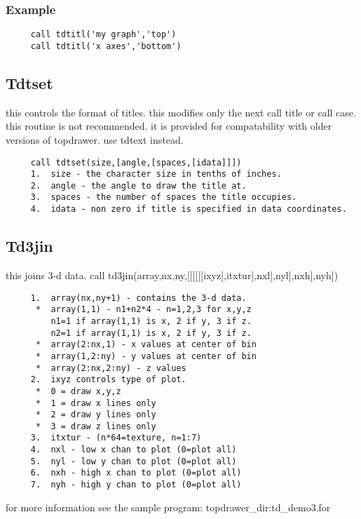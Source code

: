 \subsubsection{Example}
\begin{verbatim}
     call tdtitl('my graph','top') 
     call tdtitl('x axes','bottom') 
\end{verbatim}
\subsection{Tdtset}
this  controls  the  format  of titles.  this modifies only the next call
title or call case.  
this  routine  is not recommended.  it is provided for compatability with
older versions of topdrawer.  use tdtext instead.  
\begin{verbatim}
     call tdtset(size,[angle,[spaces,[idata]]]) 
     1.  size - the character size in tenths of inches.  
     2.  angle - the angle to draw the title at.  
     3.  spaces - the number of spaces the title occupies.  
     4.  idata - non zero if title is specified in data coordinates.  
\end{verbatim}
\subsection{Td3jin}
this joins 3-d data.  
call td3jin(array,nx,ny,[[[[[[ixyz],itxtur],nxl],nyl],nxh],nyh]) 
\begin{verbatim}
     1.  array(nx,ny+1) - contains the 3-d data.  
      *  array(1,1) - n1+n2*4 - n=1,2,3 for x,y,z 
         n1=1 if array(1,1) is x, 2 if y, 3 if z.  
         n2=1 if array(1,1) is x, 2 if y, 3 if z.  
      *  array(2:nx,1) - x values at center of bin 
      *  array(1,2:ny) - y values at center of bin 
      *  array(2:nx,2:ny) - z values 
     2.  ixyz controls type of plot.  
      *  0 = draw x,y,z 
      *  1 = draw x lines only 
      *  2 = draw y lines only 
      *  3 = draw z lines only 
     3.  itxtur - (n*64=texture, n=1:7) 
     4.  nxl - low x chan to plot (0=plot all) 
     5.  nyl - low y chan to plot (0=plot all) 
     6.  nxh - high x chan to plot (0=plot all) 
     7.  nyh - high y chan to plot (0=plot all) 
\end{verbatim}
for more information see the sample program:  topdrawer\_dir:td\_demo3.for 
